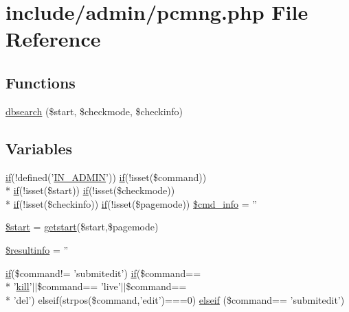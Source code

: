 \hypertarget{pcmng_8php}{\section{include/admin/pcmng.php File Reference}
\label{pcmng_8php}
}
\subsection*{Functions}
\begin{DoxyCompactItemize}
\item 
\hyperlink{pcmng_8php_ab73b2f52f5b37f4e82c009aa977ce5b5}{dbsearch} (\$start, \$checkmode, \$checkinfo)
\end{DoxyCompactItemize}
\subsection*{Variables}
\begin{DoxyCompactItemize}
\item 
\hyperlink{login__old_8php_a4ac1118c2e44c513a674bc1793ba6c90}{if}(!defined('\hyperlink{admin_8php_ad49472b0cdee543164375bf133a537f1}{I\+N\+\_\+\+A\+D\+M\+I\+N}')) \hyperlink{login__old_8php_a4ac1118c2e44c513a674bc1793ba6c90}{if}(!isset(\$command)) \\*
\hyperlink{login__old_8php_a4ac1118c2e44c513a674bc1793ba6c90}{if}(!isset(\$start)) \hyperlink{login__old_8php_a4ac1118c2e44c513a674bc1793ba6c90}{if}(!isset(\$checkmode)) \\*
\hyperlink{login__old_8php_a4ac1118c2e44c513a674bc1793ba6c90}{if}(!isset(\$checkinfo)) \hyperlink{login__old_8php_a4ac1118c2e44c513a674bc1793ba6c90}{if}(!isset(\$pagemode)) \hyperlink{pcmng_8php_abeffdbe990926c69b5d0bdb6505e39c3}{\$cmd\+\_\+info} = ''
\item 
\hyperlink{pcmng_8php_a50a00e7de77365e00b117e73aa82fb9b}{\$start} = \hyperlink{admin_8php_a774c9803a78dae80dd7b9a2301393b4a}{getstart}(\$start,\$pagemode)
\item 
\hyperlink{pcmng_8php_a65157e6920113390d5fb39352a29157d}{\$resultinfo} = ''
\item 
\hyperlink{login__old_8php_a4ac1118c2e44c513a674bc1793ba6c90}{if}(\$command!= 'submitedit') \hyperlink{login__old_8php_a4ac1118c2e44c513a674bc1793ba6c90}{if}(\$command== \\*
'\hyperlink{state_8func_8php_a2fedf1cfccaaaef7e5fff0033ded8dfc}{kill}'$\vert$$\vert$\$command== 'live'$\vert$$\vert$\$command== \\*
'del') elseif(strpos(\$command,'edit')===0) \hyperlink{pcmng_8php_aebac72f4767ff39b22abc0d8f2793660}{elseif} (\$command== 'submitedit')
\end{DoxyCompactItemize}


